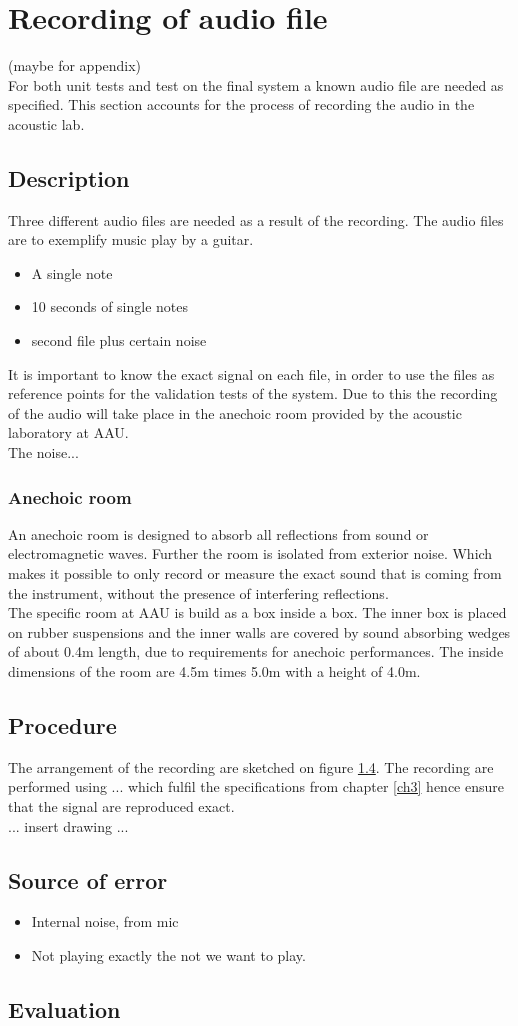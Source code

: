 \section{Recording of audio file}
(maybe for appendix)\\
For both unit tests and test on the final system a known audio file are needed as specified. This section accounts for the process of recording the audio in the acoustic lab.
\subsection{Description}
Three different audio files are needed as a result of the recording. The audio files are to exemplify music play by a guitar.   
\begin{itemize}
\item[1.] A single note  
\item[2.] 10 seconds of single notes  
\item[3.] second file plus certain noise
\end{itemize} 
It is important to know the exact signal on each file, in order to use the files as reference points for the validation tests of the system. Due to this the recording of the audio will take place in the anechoic room provided by the acoustic laboratory at AAU.\\
The noise...

\subsubsection{Anechoic room}   
An anechoic room is designed to absorb all reflections from sound or electromagnetic waves. Further the room is isolated from exterior noise. Which makes it possible to only record or measure the exact sound that is coming from the instrument, without the presence of interfering reflections. \\ The specific room at AAU is build as a box inside a box. The inner box is placed on rubber suspensions and the inner walls are covered by sound absorbing wedges of about 0.4m length, due to requirements for anechoic performances. The inside dimensions of the room are 4.5m times 5.0m with a height of 4.0m.\cite{anechoic}

\subsection{Procedure}
The arrangement of the recording are sketched on figure \ref{}. The recording are performed using ... which fulfil the specifications from chapter \ref{ch3} hence ensure that the signal are reproduced exact.\\ 
... insert drawing ...


\subsection{Source of error}
\begin{itemize}
\item[-] Internal noise, from mic 
\item[-]	 Not playing exactly the not we want to play. 
\end{itemize}

\subsection{Evaluation}
 


